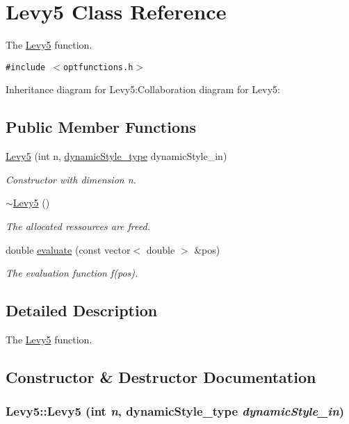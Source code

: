 \hypertarget{classLevy5}{
\section{Levy5 Class Reference}
\label{classLevy5}
}
The \hyperlink{classLevy5}{Levy5} function.  


{\tt \#include $<$optfunctions.h$>$}

Inheritance diagram for Levy5:Collaboration diagram for Levy5:\subsection*{Public Member Functions}
\begin{CompactItemize}
\item 
\hyperlink{classLevy5_7277f4c2eb6f47a832a0f5a643731388}{Levy5} (int n, \hyperlink{optfunctions_8h_ae9aa3a5dd199a43e77abc2cccf4477e}{dynamicStyle\_\-type} dynamicStyle\_\-in)
\begin{CompactList}\small\item\em Constructor with dimension n. \item\end{CompactList}\item 
\hyperlink{classLevy5_8a7751f0616e3846d8a6b27af0f79062}{$\sim$Levy5} ()
\begin{CompactList}\small\item\em The allocated ressources are freed. \item\end{CompactList}\item 
double \hyperlink{classLevy5_ac62f31602725e819687853a95068331}{evaluate} (const vector$<$ double $>$ \&pos)
\begin{CompactList}\small\item\em The evaluation function f(pos). \item\end{CompactList}\end{CompactItemize}


\subsection{Detailed Description}
The \hyperlink{classLevy5}{Levy5} function. 

\subsection{Constructor \& Destructor Documentation}
\hypertarget{classLevy5_7277f4c2eb6f47a832a0f5a643731388}{
\subsubsection{\setlength{\rightskip}{0pt plus 5cm}Levy5::Levy5 (int {\em n}, \/  {\bf dynamicStyle\_\-type} {\em dynamicStyle\_\-in})}}
\label{classLevy5_7277f4c2eb6f47a832a0f5a643731388}


